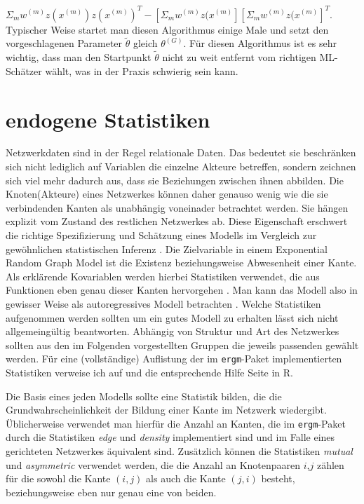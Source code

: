 \documentclass[a4paper,ngerman,oneside,titlepage,bibliography=totoc,11pt]{scrreprt}
\begin{document}
$\Sigma_m w^{(m)} z(x^{(m)}) z(x^{(m)})^T - \left[\Sigma_m w^{(m)} z(x^{(m)}\right] \left[\Sigma_m w^{(m)} z(x^{(m)}\right]^T$.
Typischer Weise startet man diesen Algorithmus einige Male und setzt den vorgeschlagenen Parameter $\widetilde{\theta}$ gleich $\theta^{(G)}$. Für diesen Algorithmus ist es sehr wichtig, dass man den Startpunkt $\widetilde{\theta}$ nicht zu weit entfernt vom richtigen ML-Schätzer wählt, was in der Praxis schwierig sein kann.

\section{endogene Statistiken}
Netzwerkdaten sind in der Regel relationale Daten. Das bedeutet sie beschränken sich nicht lediglich auf Variablen die einzelne Akteure betreffen, sondern zeichnen sich viel mehr dadurch aus, dass sie Beziehungen zwischen ihnen abbilden. Die Knoten(Akteure) eines Netzwerkes können daher genauso wenig wie die sie verbindenden Kanten als unabhängig voneinader betrachtet werden. Sie hängen explizit vom Zustand des restlichen Netzwerkes ab. Diese Eigenschaft erschwert die richtige Spezifizierung und Schätzung eines Modells im Vergleich zur gewöhnlichen statistischen Inferenz \citep{handcock2008statnet}. 
Die Zielvariable in einem Exponential Random Graph Model ist die Existenz beziehungsweise Abwesenheit einer Kante. Als erklärende Kovariablen werden hierbei Statistiken verwendet, die aus Funktionen eben genau dieser Kanten hervorgehen . Man kann das Modell also in gewisser Weise als autoregressives Modell betrachten \citep{morris2008specification}. Welche Statistiken aufgenommen werden sollten um ein gutes Modell zu erhalten lässt sich nicht allgemeingültig beantworten. Abhängig von Struktur und Art des Netzwerkes sollten aus den im Folgenden vorgestellten Gruppen die jeweils passenden gewählt werden. Für eine (vollständige) Auflistung der im \texttt{ergm}-Paket \citep{pack:ergm} implementierten Statistiken verweise ich auf \citep{morris2008specification} und die entsprechende Hilfe Seite in R.

Die Basis eines jeden Modells sollte eine Statistik bilden, die die Grundwahrscheinlichkeit der Bildung einer Kante im Netzwerk wiedergibt. Üblicherweise verwendet man hierfür die Anzahl an Kanten, die im \texttt{ergm}-Paket durch die Statistiken \textit{edge} und \textit{density} implementiert sind und im Falle eines gerichteten Netzwerkes äquivalent sind. Zusätzlich können die Statistiken \textit{mutual} und \textit{asymmetric} verwendet werden, die die Anzahl an Knotenpaaren $i$,$j$ zählen für die sowohl die Kante $(i,j)$ als auch die Kante $(j,i)$ besteht, beziehungsweise eben nur genau eine von beiden.
\end{document}
